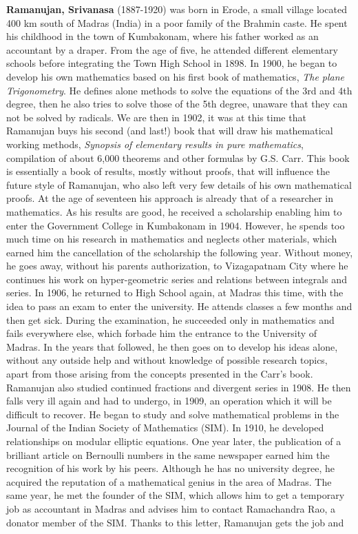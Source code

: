 \textbf{Ramanujan, Srivanasa} (1887-1920) was born in Erode, a small village located 400 km south of Madras (India) in a poor family of the Brahmin caste. He spent his childhood in the town of Kumbakonam, where his father worked as an accountant by a draper. From the age of five, he attended different elementary schools before integrating the Town High School in 1898. In 1900, he began to develop his own mathematics based on his first book of mathematics, \textit{The plane Trigonometry}. He defines alone methods to solve the equations of the 3rd and 4th degree, then he also tries to solve those of the 5th degree, unaware that they can not be solved by radicals. We are then in 1902, it was at this time that Ramanujan buys his second (and last!) book that will draw his mathematical working methods, \textit{Synopsis of elementary results in pure mathematics}, compilation of about 6,000 theorems and other formulas by G.S. Carr. This book is essentially a book of results, mostly without proofs, that will influence the future style of Ramanujan, who also left very few details of his own mathematical proofs. At the age of seventeen his approach is already that of a researcher in mathematics. As his results are good, he received a scholarship enabling him to enter the Government College in Kumbakonam in 1904. However, he spends too much time on his research in mathematics and neglects other materials, which earned him the cancellation of the scholarship the following year. Without money, he goes away, without his parents authorization, to Vizagapatnam City where he continues his work on hyper-geometric series and relations between integrals and series. In 1906, he returned to High School again, at Madras this time, with the idea to pass an exam to enter the university. He attends classes a few months and then get sick. During the examination, he succeeded only in mathematics and fails everywhere else, which forbade him the entrance to the University of Madras. In the years that followed, he then goes on to develop his ideas alone, without any outside help and without knowledge of possible research topics, apart from those arising from the concepts presented in the Carr's book. Ramanujan also studied continued fractions and divergent series in 1908. He then falls very ill again and had to undergo, in 1909, an operation which it will be difficult to recover. He began to study and solve mathematical problems in the Journal of the Indian Society of Mathematics (SIM). In 1910, he developed relationships on modular elliptic equations. One year later, the publication of a brilliant article on Bernoulli numbers in the same newspaper earned him the recognition of his work by his peers. Although he has no university degree, he acquired the reputation of a mathematical genius in the area of Madras. The same year, he met the founder of the SIM, which allows him to get a temporary job as accountant in Madras and advises him to contact Ramachandra Rao, a donator member of the SIM. Thanks to this letter, Ramanujan gets the job and 